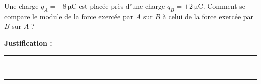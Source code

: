 Une charge $q_A = +\qty{8}{\micro\coulomb}$ est placée près d'une charge $q_B = +\qty{2}{\micro\coulomb}$. Comment se compare le module de la force exercée par $A$ sur $B$ à celui de la force exercée par $B$ sur $A$ ?

\choices

\noindent\textbf{Justification :} \hrulefill \\[2.5ex]
\rule{\linewidth}{0.4pt} \\[2.5ex]
\rule{\linewidth}{0.4pt}
\vfill
